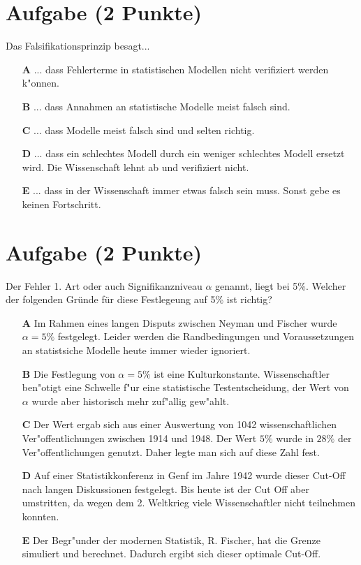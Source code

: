 \documentclass[a4paper, 10pt]{scrartcl}\usepackage[]{graphicx}\usepackage[]{xcolor}
\begin{document}
\section{Aufgabe \hfill (2 Punkte)}

Das Falsifikationsprinzip besagt... 



\begin{enumerate}
\item [\textbf{A} \msquare] ... dass Fehlerterme in statistischen Modellen nicht verifiziert werden k{"o}nnen.
\item [\textbf{B} \msquare] ... dass Annahmen an statistische Modelle meist falsch sind.
\item [\textbf{C} \msquare] ... dass Modelle meist falsch sind und selten richtig.
\item [\textbf{D} \msquare] ... dass ein schlechtes Modell durch ein weniger schlechtes Modell ersetzt wird. Die Wissenschaft lehnt ab und verifiziert nicht.
\item [\textbf{E} \msquare] ... dass in der Wissenschaft immer etwas falsch sein muss. Sonst gebe es keinen Fortschritt.
\end{enumerate}

\section{Aufgabe \hfill (2 Punkte)}

Der Fehler 1. Art oder auch Signifikanzniveau $\alpha$ genannt, liegt bei
5\%. Welcher der folgenden Gr{\"u}nde f{\"u}r diese Festlegeung auf 5\% ist richtig?



\begin{enumerate}
\item [\textbf{A} \msquare] Im Rahmen eines langen Disputs zwischen Neyman und Fischer wurde $\alpha = 5\%$ festgelegt. Leider werden die Randbedingungen und Voraussetzungen an statistsiche Modelle heute immer wieder ignoriert.
\item [\textbf{B} \msquare] Die Festlegung von $\alpha = 5\%$ ist eine Kulturkonstante. Wissenschaftler ben{"o}tigt eine Schwelle f{"u}r eine statistische Testentscheidung, der Wert von $\alpha$ wurde aber historisch mehr zuf{"a}llig gew{"a}hlt.
\item [\textbf{C} \msquare] Der Wert ergab sich aus einer Auswertung von 1042 wissenschaftlichen Ver{"o}ffentlichungen zwischen 1914 und 1948. Der Wert $5\%$ wurde in $28\%$ der Ver{"o}ffentlichungen genutzt. Daher legte man sich auf diese Zahl fest.
\item [\textbf{D} \msquare] Auf einer Statistikkonferenz in Genf im Jahre 1942 wurde dieser Cut-Off nach langen Diskussionen festgelegt. Bis heute ist der Cut Off aber umstritten, da wegen dem 2. Weltkrieg viele Wissenschaftler nicht teilnehmen konnten.
\item [\textbf{E} \msquare] Der Begr{"u}nder der modernen Statistik, R. Fischer, hat die Grenze simuliert und berechnet. Dadurch ergibt sich dieser optimale Cut-Off.
\end{enumerate}
\end{document}
